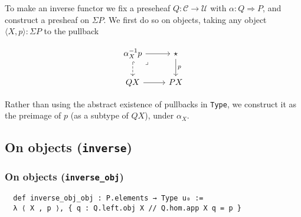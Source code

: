 \documentclass{article}
\renewcommand{\implies}{\Rightarrow}
\newcommand{\al}{\alpha}
\newcommand{\CC}{\mathcal{C}}
\newcommand{\UU}{\mathcal{U}}
\newcommand{\<}{\langle}
\renewcommand{\>}{\rangle}
\theoremstyle{definitionstyle}
\theoremstyle{exercisestyle}
\theoremstyle{remarkstyle}
\begin{document}
To make an inverse functor we fix a preseheaf $Q : \CC \to \UU$
with $\al : Q \implies P$,
and construct a presheaf on $\Sigma P$.
We first do so on objects, taking any object $\< X , p \> : \Sigma P$
to the pullback

\[\begin{tikzcd}
	{\alpha_X^{-1}p} & \star \\
	{Q X} & {P X}
	\arrow["p", from=1-2, to=2-2]
	\arrow[from=2-1, to=2-2]
	\arrow[from=1-1, to=1-2]
	\arrow[dashed, hook, from=1-1, to=2-1]
	\arrow["\lrcorner"{anchor=center, pos=0.125}, draw=none, from=1-1, to=2-2]
\end{tikzcd}\]

Rather than using the abstract existence of pullbacks in \texttt{Type},
we construct it as the preimage of $p$ (as a subtype of $Q X$),
under $\alpha_{X}$.

\subsection{ On objects (\texttt{inverse}) }

\subsubsection{ On objects (\texttt{inverse\_obj}) }
\begin{lstlisting}
  def inverse_obj_obj : P.elements → Type u₀ :=
  λ ⟨ X , p ⟩, { q : Q.left.obj X // Q.hom.app X q = p } \end{lstlisting}
\end{document}
